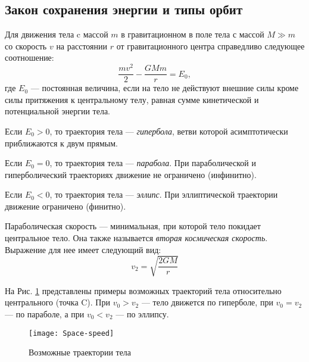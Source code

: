 \subsection{Закон сохранения энергии и типы орбит}
Для движения тела c массой $m$ в гравитационном  в поле тела 
с массой \linebreak $M\gg m$ со скорость $v$ на расстоянии $r$ от 
гравитационного центра справедливо следующее соотношение: 
\begin{equation}
\frac{m v^2}{2}-\frac{GM m }{r}=E_0,
\end{equation}
где $E_0$ --- постоянная величина, если на тело не действуют
внешние силы кроме силы притяжения к центральному телу, 
равная сумме кинетической и потенциальной энергии тела.

Если $E_0>0$, то траектория тела --- {\itshape гипербола}, 
ветви которой асимптотически приближаются к двум прямым.

Если $E_0=0$, то траектория тела --- {\itshape парабола}. При 
параболической и гиперболический траекториях движение не 
ограничено (инфинитно).

Если $E_0<0$, то траектория тела --- {\itshape эллипс}. При 
эллиптической траектории движение ограничено (финитно).

Параболическая скорость --- минимальная, при которой 
тело покидает центральное тело. Она также называется
{\itshape вторая космическая скорость}. Выражение для нее 
имеет следующий вид:\begin{equation}
v_{2}=\sqrt{\frac{2GM}{r}}
\end{equation}

На Рис. \ref{pic:orbits} представлены примеры возможных траекторий тела 
относительно центрального (точка C). При $v_0 > v_{2}$ --- тело движется 
по гиперболе, при $v_0 = v_{2}$ --- по параболе, 
а при $v_0 < v_{2}$ --- по эллипсу.
\begin{figure}[h!]
\centering
\texttt{[image: Space-speed]}
\caption{Возможные траектории тела \label{pic:orbits}}
\end{figure}